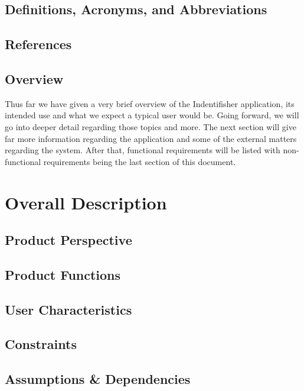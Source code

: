 \documentclass{article}
\begin{document}
\subsection{Definitions, Acronyms, and Abbreviations}

\iffalse
Anything can be added either by anyone on the team including myself, Chris.
\fi

\subsection{References}

\iffalse
Same goes for this, anything can be added as needed. I can cite if you wish.
\fi

\subsection{Overview}
Thus far we have given a very brief overview of the Indentifisher application, its intended
use and what we expect a typical user would be. Going forward, we will go into deeper detail
regarding those topics and more. The next section will give far more information regarding
the application and some of the external matters regarding the system. After that, functional
requirements will be listed with non-functional requirements being the last section of this document.

\section{Overall Description}

\subsection{Product Perspective}

\subsection{Product Functions}

\subsection{User Characteristics}

\subsection{Constraints}

\subsection{Assumptions \& Dependencies}
\end{document}
